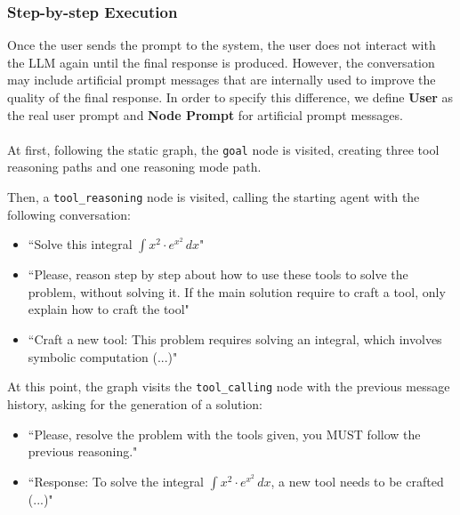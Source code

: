 \documentclass[12pt,a4paper,openright,twoside]{book}
\begin{document}
\subsubsection{Step-by-step Execution}
Once the user sends the prompt to the system, the user does not interact with the \ac{LLM} again until the final response is produced. However, the conversation may include artificial prompt messages that are internally used to improve the quality of the final response.
In order to specify this difference, we define \textbf{User} as the real user prompt and \textbf{Node Prompt} for artificial prompt messages.
\\\\ 
At first, following the static graph, the \texttt{goal} node is visited, creating three tool reasoning paths and one reasoning mode path.

Then, a \texttt{tool\_reasoning} node is visited, calling the starting agent with the following conversation:
\begin{itemize}
    \item[\textbf{User:}] ``Solve this integral $\int x^2 \cdot e^{x^2} \, dx$"
    \item[\textbf{Node Prompt:}] ``Please, reason step by step about how to use these tools to solve the problem, without solving it. If the main solution require to craft a tool, only explain how to craft the tool"
    \item[\textbf{AI:}] ``Craft a new tool: This problem requires solving an integral, which involves symbolic computation (...)"
\end{itemize}

At this point, the graph visits the \texttt{tool\_calling} node with the previous message history, asking for the generation of a solution:
\begin{itemize}
    \item[\textbf{System:}] ``Please, resolve the problem with the tools given, you MUST follow the previous reasoning."
    \item[\textbf{AI:}] ``Response: To solve the integral $\int x^2 \cdot e^{x^2} \, dx$, a new tool needs to be crafted (...)"
\end{itemize}
\end{document}

